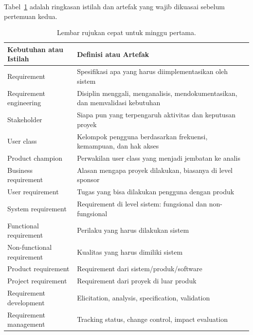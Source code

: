 \documentclass[11pt,a4paper]{article}
\begin{document}
Tabel~\ref{tab:cheat} adalah ringkasan istilah dan artefak yang wajib dikuasai sebelum pertemuan kedua.

\begin{table}[H]
	\centering
	\caption{Lembar rujukan cepat untuk minggu pertama.}
	\label{tab:cheat}
	\footnotesize
	\begin{tabularx}{\textwidth}{l X}
		\toprule
		Kebutuhan atau Istilah     & Definisi atau Artefak                                                         \\
		\midrule
		Requirement                & Spesifikasi apa yang harus diimplementasikan oleh sistem                      \\
		Requirement engineering    & Disiplin menggali, menganalisis, mendokumentasikan, dan memvalidasi kebutuhan \\
		Stakeholder                & Siapa pun yang terpengaruh aktivitas dan keputusan proyek                     \\
		User class                 & Kelompok pengguna berdasarkan frekuensi, kemampuan, dan hak akses             \\
		Product champion           & Perwakilan user class yang menjadi jembatan ke analis                         \\
		Business requirement       & Alasan mengapa proyek dilakukan, biasanya di level sponsor                    \\
		User requirement           & Tugas yang bisa dilakukan pengguna dengan produk                              \\
		System requirement         & Requirement di level sistem: fungsional dan non-fungsional                    \\
		Functional requirement     & Perilaku yang harus dilakukan sistem                                          \\
		Non-functional requirement & Kualitas yang harus dimiliki sistem                                           \\
		Product requirement        & Requirement dari sistem/produk/software                                       \\
		Project requirement        & Requirement dari proyek di luar produk                                        \\
		Requirement development    & Elicitation, analysis, specification, validation                              \\
		Requirement management     & Tracking status, change control, impact evaluation                            \\

\end{tabularx}
\end{table}
\end{document}
